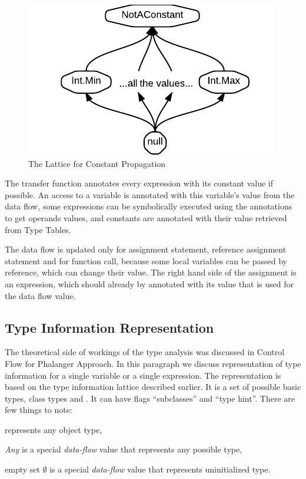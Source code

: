 \begin{figure}[h]  
  \centering
    \includegraphics{img/ConstLattice.pdf}  
    \caption{The Lattice for Constant Propagation\label{constlattice}}
\end{figure}        
        
        The transfer function annotates every expression 
        with its constant value if possible. An access to a 
        variable is annotated with this variable's value 
        from the data flow, some expressions can be symbolically 
        executed using the annotations to get operands values, 
        and constants are annotated with their value retrieved 
        from Type Tables.
        
        The data flow is updated only for assignment statement, 
        reference assignment statement and for function call, 
        because some local variables can be passed by reference, 
        which can change their value. The right hand side of 
        the assignment is an expression, which should already by 
        annotated with its value that is used for the data 
        flow value.

    \subsection{Type Information Representation}        
        The theoretical side of workings of the type analysis was 
        discussed in \wsection{} Control Flow for Phalanger Approach.         
        In this paragraph we discuss representation of 
        type information for a single variable or a single expression. 
        The representation is based on the type information 
        lattice described earlier. It is a set of possible 
        basic types, class types and . It can 
        have flags ``subclasses'' and ``type hint''. 
        There are few things to note:
        \begin{itemize*}
            \item {} represents any object type, 
            \item \emph{Any} is a special \emph{data-flow} value that 
                represents any possible type, 
            \item empty set $\emptyset$  is a special \emph{data-flow} value that 
                represents uninitialized type.
        \end{itemize*}
        
